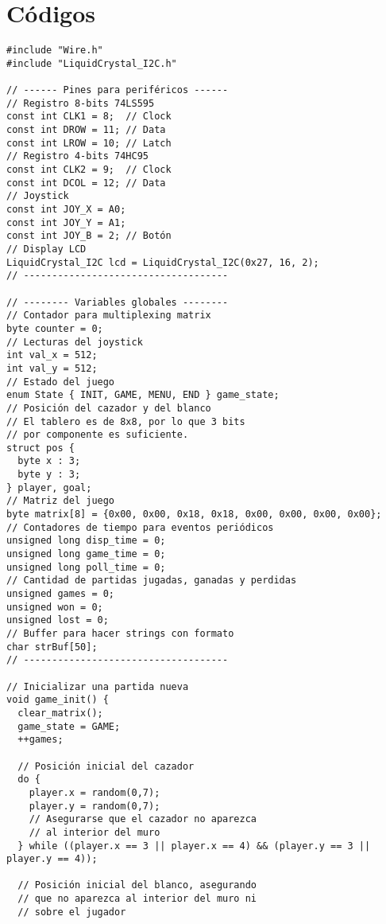 \section{Códigos}


\begin{listing}[H]
  \scriptsize
  \begin{verbatim}
#include "Wire.h"
#include "LiquidCrystal_I2C.h"

// ------ Pines para periféricos ------
// Registro 8-bits 74LS595
const int CLK1 = 8;  // Clock
const int DROW = 11; // Data
const int LROW = 10; // Latch
// Registro 4-bits 74HC95
const int CLK2 = 9;  // Clock
const int DCOL = 12; // Data
// Joystick
const int JOY_X = A0;
const int JOY_Y = A1;
const int JOY_B = 2; // Botón
// Display LCD
LiquidCrystal_I2C lcd = LiquidCrystal_I2C(0x27, 16, 2);
// ------------------------------------

// -------- Variables globales --------
// Contador para multiplexing matrix
byte counter = 0;
// Lecturas del joystick
int val_x = 512;
int val_y = 512;
// Estado del juego
enum State { INIT, GAME, MENU, END } game_state;
// Posición del cazador y del blanco
// El tablero es de 8x8, por lo que 3 bits
// por componente es suficiente.
struct pos {
  byte x : 3;
  byte y : 3;
} player, goal;
// Matriz del juego
byte matrix[8] = {0x00, 0x00, 0x18, 0x18, 0x00, 0x00, 0x00, 0x00};
// Contadores de tiempo para eventos periódicos
unsigned long disp_time = 0;
unsigned long game_time = 0;
unsigned long poll_time = 0;
// Cantidad de partidas jugadas, ganadas y perdidas
unsigned games = 0;
unsigned won = 0;
unsigned lost = 0;
// Buffer para hacer strings con formato
char strBuf[50];
// ------------------------------------

// Inicializar una partida nueva
void game_init() {
  clear_matrix();
  game_state = GAME;
  ++games;

  // Posición inicial del cazador
  do {
    player.x = random(0,7);
    player.y = random(0,7);
    // Asegurarse que el cazador no aparezca
    // al interior del muro
  } while ((player.x == 3 || player.x == 4) && (player.y == 3 || player.y == 4));

  // Posición inicial del blanco, asegurando
  // que no aparezca al interior del muro ni
  // sobre el jugador
\end{verbatim}

\end{listing}
